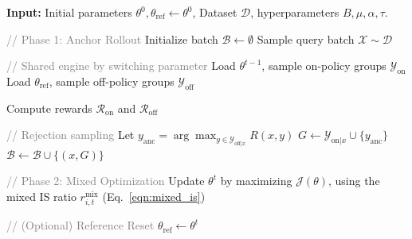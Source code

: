 {
\renewcommand{\algorithmicthen}{}
\begin{algorithm}[t]
\begin{algorithmic}[1]
\STATE \textbf{Input:} Initial parameters $\theta^0, \theta_\text{ref} \leftarrow \theta^0$, Dataset $\mathcal{D}$, hyperparameters $B, \mu, \alpha, \tau$.

    \STATE \textcolor{gray}{// Phase 1: Anchor Rollout}
    \STATE Initialize batch $\mathcal{B} \leftarrow \emptyset$
        \STATE Sample query batch $\mathcal X \sim \mathcal{D}$

        \STATE \textcolor{gray}{// Shared engine by switching parameter}
        \STATE Load $\theta^{t-1}$, sample on-policy groups $\mathcal{Y}_{\text{on}}$
        \STATE Load $\theta_\text{ref}$, sample off-policy groups $\mathcal{Y}_{\text{off}}$\label{line:rollout}
        
        \STATE Compute rewards $\mathcal R_{\text{on}}$ and $\mathcal R_{\text{off}}$

        \STATE \textcolor{gray}{// Rejection sampling}\label{line:reject}
            \STATE Let $y_{\text{anc}} = \arg\max_{y\in \mathcal{Y}_{\text{off}|x}} R(x, y)$
            \STATE $G \leftarrow \mathcal{Y}_{\text{on}|x} \cup \{y_{\text{anc}}\}$
            \STATE $\mathcal{B} \leftarrow \mathcal{B} \cup \{(x,G)\}$ 
        \ENDIF
        \ENDFOR
    \ENDWHILE
    
    \STATE \textcolor{gray}{// Phase 2: Mixed Optimization}
    \STATE Update $\theta^t$ by maximizing $\mathcal{J}(\theta)$, using the mixed IS ratio $r_{i,t}^\text{mix}$ (Eq.~\ref{eqn:mixed_is})
    \ENDFOR
    
    \STATE \textcolor{gray}{// (Optional) Reference Reset}\label{line:ref}
        \STATE $\theta_\text{ref} \leftarrow \theta^t$
    \ENDIF
\ENDFOR
\end{algorithmic}
\caption{ARMOR Training Framework}\label{alg:armor}
\end{algorithm}
}

